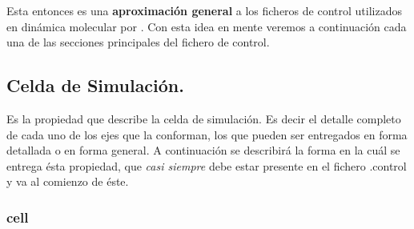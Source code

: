 
Esta entonces es una \textbf{aproximaci\'on general} a los ficheros de control utilizados en din\'amica molecular por {\lpmd}. Con esta idea en mente veremos a continuaci\'on cada una de las secciones principales del fichero de control.

\subsection{Celda de Simulaci\'on.}

Es la propiedad que describe la celda de simulaci\'on. Es decir el detalle completo de cada uno de los ejes que la conforman, los que pueden ser entregados en forma detallada o en forma general. A continuaci\'on se describir\'a la forma en la cu\'al se entrega \'esta propiedad, que \textit{casi siempre} debe estar presente en el fichero .control y va al comienzo de \'este.

\subsubsection{cell}

